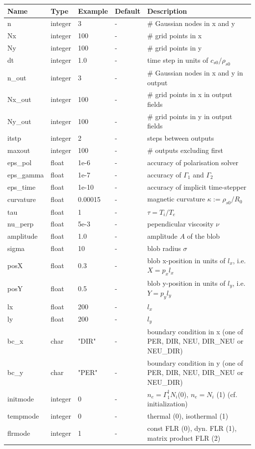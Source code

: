 \begin{longtable}{llll>{\RaggedRight}p{7cm}}
\toprule
\rowcolor{gray!50}\textbf{Name} &  \textbf{Type} & \textbf{Example} & \textbf{Default} & \textbf{Description}  \\ \midrule
n      & integer & 3 & - &\# Gaussian nodes in x and y \\
Nx     & integer &100& - &\# grid points in x \\
Ny     & integer &100& - &\# grid points in y \\
dt     & integer &1.0& - &time step in units of $c_{s0}/\rho_{s0}$ \\
n\_out  & integer &3  & - &\# Gaussian nodes in x and y in output \\
Nx\_out & integer &100& - &\# grid points in x in output fields \\
Ny\_out & integer &100& - &\# grid points in y in output fields \\
itstp  & integer &2  & - &   steps between outputs \\
maxout & integer &100& - &      \# outputs excluding first \\
eps\_pol   & float &1e-6    & - &  accuracy of polarisation solver \\
eps\_gamma & float &1e-7    & - & accuracy of $\Gamma_1$ and $\Gamma_2$\\
eps\_time  & float &1e-10   & - & accuracy of implicit time-stepper \\
curvature  & float &0.00015& - & magnetic curvature $\kappa:=\rho_{s0}/R_0$ \\
tau        & float &1      & - & $\tau = T_i/T_e$  \\
nu\_perp    & float &5e-3   & - & pependicular viscosity $\nu$ \\
amplitude  & float &1.0    & - & amplitude $A$ of the blob \\
sigma      & float &10     & - & blob radius $\sigma$ \\
posX       & float &0.3    & - & blob x-position in units of $l_x$, i.e. $X = p_x l_x$\\
posY       & float &0.5    & - & blob y-position in units of $l_y$, i.e. $Y = p_y l_y$ \\
lx         & float &200    & - & $l_x$  \\
ly         & float &200    & - & $l_y$  \\
bc\_x   & char & "DIR"      & - & boundary condition in x (one of PER, DIR, NEU, DIR\_NEU or NEU\_DIR) \\
bc\_y   & char & "PER"      & - & boundary condition in y (one of PER, DIR, NEU, DIR\_NEU or NEU\_DIR) \\
initmode  & integer & 0 & - & \(n_e = \Gamma_1^\dagger N_i\)(0), \(n_e = N_i\) (1) (cf. initialization)\\
tempmode & integer & 0    & - &thermal (0), isothermal (1)\\
flrmode  & integer & 1    & - &const FLR (0), dyn. FLR (1), matrix product FLR (2)\\
\bottomrule
\end{longtable}

